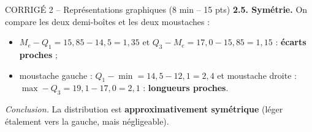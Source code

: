 \documentclass[11pt,a4paper]{article}
\begin{document}
\begin{epreuve}{CORRIGÉ 2 -- Représentations graphiques \hfill \small (8 min -- 15 pts)}
\medskip
\textbf{2.5. Symétrie.} On compare les deux demi-boîtes et les deux moustaches :
\begin{itemize}[leftmargin=*,itemsep=1pt]
  \item $M_e - Q_1 = 15{,}85 - 14{,}5 = 1{,}35$ \quad et \quad $Q_3 - M_e = 17{,}0 - 15{,}85 = 1{,}15$ : \textbf{écarts proches} ;
  \item moustache gauche : $Q_1 - \min = 14{,}5 - 12{,}1 = 2{,}4$ \quad et \quad moustache droite : $\max - Q_3 = 19{,}1 - 17{,}0 = 2{,}1$ : \textbf{longueurs proches}.
\end{itemize}
\emph{Conclusion.} La distribution est \textbf{approximativement symétrique} (léger étalement vers la gauche, mais négligeable).

\end{epreuve}

\newpage
\end{document}

